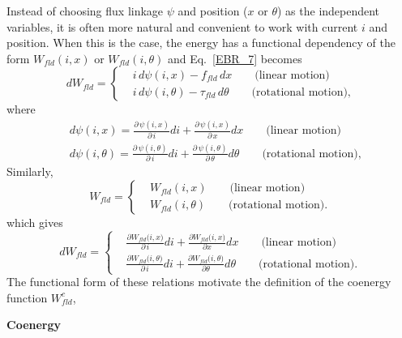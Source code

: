 \documentclass[12pt,a4paper,oneside]{book}
\begin{document}
\begin{onehalfspace}
Instead of choosing flux linkage $\psi$ and position ($x$ or $\theta$) as the independent variables, it is often more natural and convenient to work with current $i$ and position. When this is the case, the energy has a functional dependency of the form $W_{fld}(i,x)$ or $W_{fld}(i,\theta)$ and Eq.~\eqref{EBR_7} becomes
\begin{equation}\label{EBR_12}
	dW_{fld}  = \left\{
	\begin{aligned}
		&i\,d\psi(i,x) - f_{fld}\,dx \qquad \text{(linear motion)} \\[8pt]
		&i\,d\psi(i,\theta) - \tau_{fld}\,d\theta \qquad \text{(rotational motion),} 
	\end{aligned}\right.
\end{equation} 
where
\begin{equation}\label{EBR_13}
	\begin{aligned}
		&d\psi(i,x) = \frac{\partial\,\psi(i,x)}{\partial\,i}di + \frac{\partial\,\psi(i,x)}{\partial\,x}dx \qquad \text{(linear motion)} \\[8pt]
		&d\psi(i,\theta) = \frac{\partial\,\psi(i,\theta)}{\partial\,i}di + \frac{\partial\,\psi(i,\theta)}{\partial\,\theta}d\theta \qquad \text{(rotational motion),} 
	\end{aligned}
\end{equation} 
Similarly, 
\begin{equation*}
	W_{fld} = \left\{
	\begin{aligned}
		&W_{fld}(i,x) \qquad \text{(linear motion)} \\[8pt]
		&W_{fld}(i,\theta) \qquad \text{(rotational motion).} 
	\end{aligned}\right.
\end{equation*}
which gives
\begin{equation}\label{EBR_14}
	dW_{fld}  = \left\{
	\begin{aligned}
		&\frac{\partial W_{fld}\big(i,x\big)}{\partial\,i}di +  \frac{\partial W_{fld}\big(i,x\big)}{\partial x}dx \qquad \text{(linear motion)} \\[8pt]
		&\frac{\partial W_{fld}\big(i,\theta\big)}{\partial\,i}di +  \frac{\partial W_{fld}\big(i,\theta\big)}{\partial \theta}d\theta \qquad \text{(rotational motion).} 
	\end{aligned}\right.
\end{equation} 
The functional form of these relations motivate the definition of the coenergy function $W_{fld}^c$,
\begin{center}
	\textbf{Coenergy}
\end{center}

\end{onehalfspace}
\end{document}
